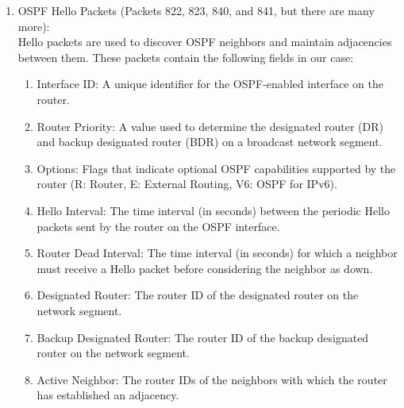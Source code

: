 \begin{enumerate}[label=\arabic*.]
\item OSPF Hello Packets (Packets 822, 823, 840, and 841, but there are many more):\\
Hello packets are used to discover OSPF neighbors and maintain adjacencies between them. These packets contain the following fields in our case:
  \begin{enumerate}[label=\arabic*.]
  \item Interface ID: A unique identifier for the OSPF-enabled interface on the router.
  \item Router Priority: A value used to determine the designated router (DR) and backup designated router (BDR) on a broadcast network segment.
  \item Options: Flags that indicate optional OSPF capabilities supported by the router (R: Router, E: External Routing, V6: OSPF for IPv6).
  \item Hello Interval: The time interval (in seconds) between the periodic Hello packets sent by the router on the OSPF interface.
  \item Router Dead Interval: The time interval (in seconds) for which a neighbor must receive a Hello packet before considering the neighbor as down.
  \item Designated Router: The router ID of the designated router on the network segment.
  \item Backup Designated Router: The router ID of the backup designated router on the network segment.
  \item Active Neighbor: The router IDs of the neighbors with which the router has established an adjacency.
  \end{enumerate}


\end{enumerate}
